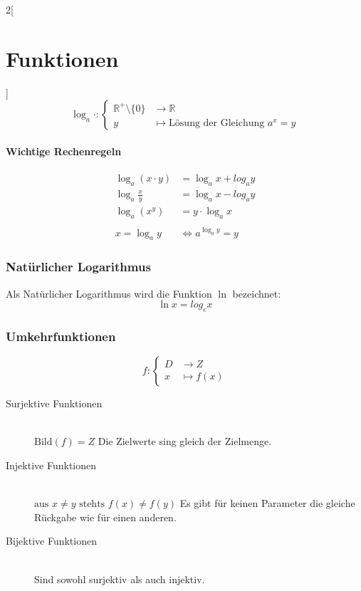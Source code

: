 \begin{multicols}{2}[
	\section{Funktionen}
]
	\[
		\log_a \cdot : \begin{cases}
			\mathbb{R}^+ \setminus \{0\} &\to \mathbb{R} \\
			y &\mapsto \text{Lösung der Gleichung } a^x = y
		\end{cases}
	\]

	\paragraph{Wichtige Rechenregeln}
		\begin{align*}
			\log_a{(x \cdot y)} &= \log_a{x} + log_a{y} \\
			\log_a{\frac{x}{y}} &= \log_a{x} - log_a{y} \\
			\log_a{(x^y)} &= y \cdot \log_a{x} \\ \\
			x=\log_a{y} &\Leftrightarrow a^{\log_a{y}} = y
		\end{align*}

\subsubsection{Natürlicher Logarithmus}
	Als Natürlicher Logarithmus wird die Funktion $\ln$ bezeichnet:
	\[
		\ln{x} = log_e{x}
	\]
	
\subsubsection{Umkehrfunktionen}
	
	\[
		f: \begin{cases}
			D &\to Z \\
			x &\mapsto f(x)
		\end{cases}
	\]
	
	\begin{description}
		\item[Surjektive Funktionen] \hfill \\
			$\text{Bild}(f) = Z$ \newline Die Zielwerte sing gleich der Zielmenge.
		\item[Injektive Funktionen] \hfill \\
			$\text{aus } x \neq y \text{ stehts } f(x) \neq f(y)$ \newline Es gibt für keinen Parameter die gleiche Rückgabe wie für einen anderen.
		\item[Bijektive Funktionen] \hfill \\
			Sind sowohl surjektiv als auch injektiv.
	\end{description}
	


\end{multicols}
